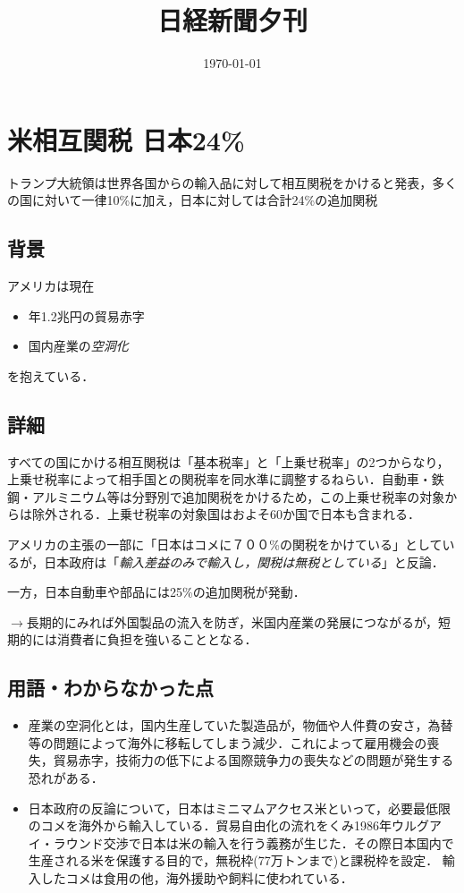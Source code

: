 \documentclass{ltjsarticle}
\title{日経新聞夕刊}
\author{}
\date{\today}
\begin{document}
\maketitle

\section{米相互関税 日本24\%}

トランプ大統領は世界各国からの輸入品に対して相互関税をかけると発表，多くの国に対いて一律10\%に加え，日本に対しては合計24\%の追加関税

\subsection{背景}

アメリカは現在
\begin{itemize}
  \item 年1.2兆円の貿易赤字
  \item 国内産業の\emph{空洞化}
\end{itemize}
を抱えている．

\subsection{詳細}

すべての国にかける相互関税は「基本税率」と「上乗せ税率」の2つからなり，上乗せ税率によって相手国との関税率を同水準に調整するねらい．自動車・鉄鋼・アルミニウム等は分野別で追加関税をかけるため，この上乗せ税率の対象からは除外される．上乗せ税率の対象国はおよそ60か国で日本も含まれる．

アメリカの主張の一部に「日本はコメに７００\%の関税をかけている」としているが，日本政府は「\emph{輸入差益のみで輸入し，関税は無税としている}」と反論．

一方，日本自動車や部品には25\%の追加関税が発動．

$\rightarrow $長期的にみれば外国製品の流入を防ぎ，米国内産業の発展につながるが，短期的には消費者に負担を強いることとなる．


\subsection{用語・わからなかった点}

\begin{itemize}
  \item 産業の空洞化とは，国内生産していた製造品が，物価や人件費の安さ，為替等の問題によって海外に移転してしまう減少．これによって雇用機会の喪失，貿易赤字，技術力の低下による国際競争力の喪失などの問題が発生する恐れがある．
  \item 日本政府の反論について，日本はミニマムアクセス米といって，必要最低限のコメを海外から輸入している．貿易自由化の流れをくみ1986年ウルグアイ・ラウンド交渉で日本は米の輸入を行う義務が生じた．その際日本国内で生産される米を保護する目的で，無税枠(77万トンまで)と課税枠を設定．
  輸入したコメは食用の他，海外援助や飼料に使われている．
\end{itemize}
\end{document}

